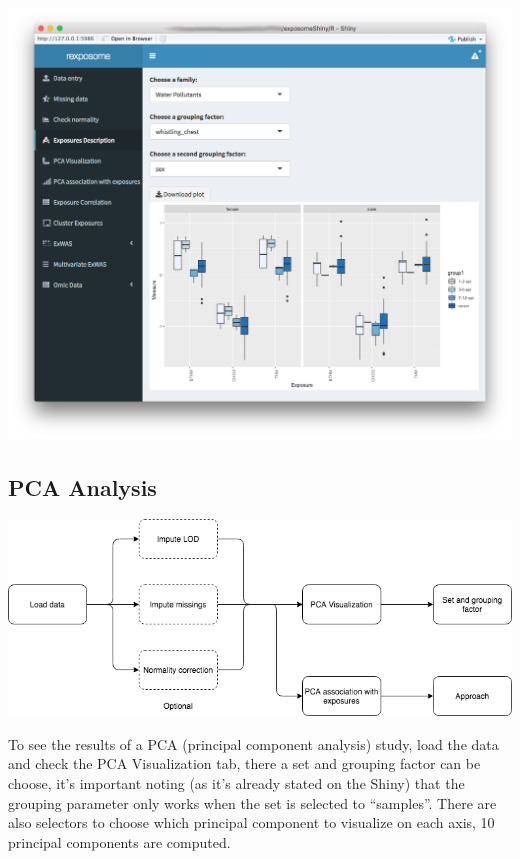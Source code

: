 \documentclass[
]{book}
\begin{document}
\includegraphics{images/analysis4_2.png}

\hypertarget{pca-analysis}{%
\subsection{PCA Analysis}\label{pca-analysis}}

\includegraphics{images/analysis5_1.png}

To see the results of a PCA (principal component analysis) study, load the data and check the PCA Visualization tab, there a set and grouping factor can be choose, it's important noting (as it's already stated on the Shiny) that the grouping parameter only works when the set is selected to ``samples''. There are also selectors to choose which principal component to visualize on each axis, 10 principal components are computed.
\end{document}
